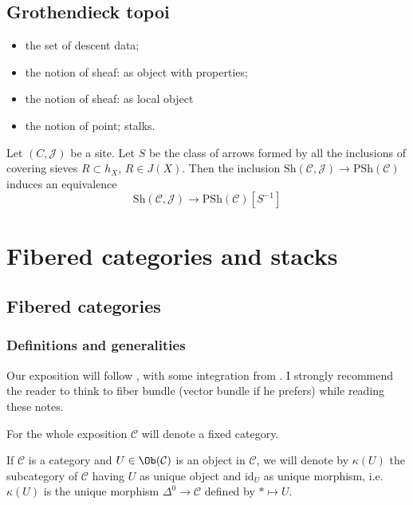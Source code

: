 \subsection{Grothendieck topoi}

\begin{itemize}
\item the set of descent data;
\item the notion of sheaf: as object with properties;
\item the notion of sheaf: as local object
\item the notion of point; stalks.
\end{itemize}

\begin{thm}
Let $(C,\mathcal J)$ be a site. Let $S$ be the class of arrows formed by all the inclusions of covering sieves $R \subset h_X$, $R \in J(X)$. Then the inclusion $\mathrm{Sh}(\mathcal C, \mathcal J) \to \mathrm{PSh}(\mathcal C)$ induces an equivalence
\[
\mathrm{Sh}(\mathcal C, \mathcal J) \to \mathrm{PSh}(\mathcal C)[S^{-1}]
\]
\end{thm}

\section{Fibered categories and stacks} \label{fibered categories}

\subsection{Fibered categories}

\subsubsection*{Definitions and generalities}

Our exposition will follow , with some integration from . I strongly recommend the reader to think to fiber bundle (vector bundle if he prefers) while reading these notes.

For the whole exposition $\mathcal C$ will denote a fixed category.

\begin{notation}
If $\mathcal C$ is a category and $U \in \Ob(\mathcal C)$ is an object in $\mathcal C$, we will denote by $\kappa(U)$ the subcategory of $\mathcal C$ having $U$ as unique object and $\mathrm{id}_U$ as unique morphism, i.e. $\kappa(U)$ is the unique morphism $\Delta^0 \to \mathcal C$ defined by $* \mapsto U$.
\end{notation}

